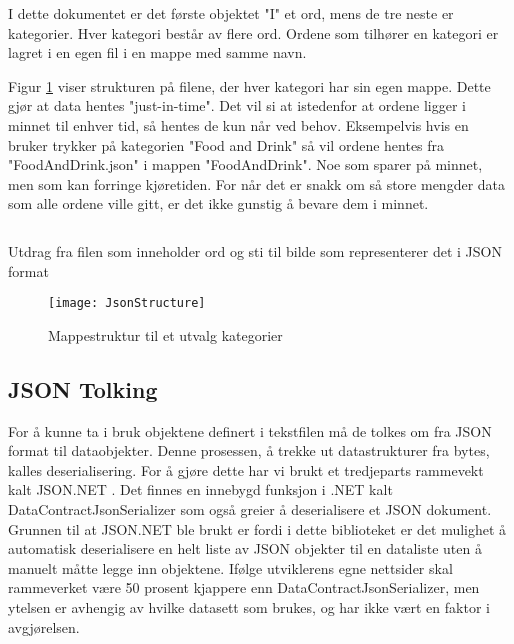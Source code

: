 I dette dokumentet er det første objektet "I" et ord, mens de tre neste er kategorier. Hver kategori består av flere ord. Ordene som tilhører en kategori er lagret i en egen fil i en mappe med samme navn. 

Figur \ref{fig:jsonstructure} viser strukturen på filene, der hver kategori har sin egen mappe. Dette gjør at data hentes "just-in-time". Det vil si at istedenfor at ordene ligger i minnet til enhver tid, så hentes de kun når ved behov. Eksempelvis hvis en bruker trykker på kategorien "Food and Drink" så vil ordene hentes fra "FoodAndDrink.json" i mappen "FoodAndDrink". Noe som sparer på minnet, men som kan forringe kjøretiden. For når det er snakk om så store mengder data som alle ordene ville gitt, er det ikke gunstig å bevare dem i minnet. 


\begin{listing}[ht] 
\inputminted[fontsize=\footnotesize, frame=lines,framesep=2mm,baselinestretch=1.2,bgcolor=lightgray,linenos]{json}{Code/JSONfile.json} 
\caption{Utdrag fra filen som inneholder ord og sti til bilde som representerer det i JSON format} 
\label{listing:jsonfile} 
\end{listing} 
 

 \begin{figure}[ht!] 
\centering 
\texttt{[image: JsonStructure]} 
\caption{Mappestruktur til et utvalg kategorier} 
\label{fig:jsonstructure} 
\end{figure} 


\subsection{JSON Tolking}

For å kunne ta i bruk objektene definert i tekstfilen må de tolkes om fra JSON format til dataobjekter. Denne prosessen, å trekke ut datastrukturer fra bytes, kalles deserialisering. For å gjøre dette har vi brukt et tredjeparts rammevekt kalt JSON.NET \cite{Json.0:online}. Det finnes en innebygd funksjon i .NET kalt DataContractJsonSerializer \cite{DataC3:online} som også greier å deserialisere et JSON dokument. Grunnen til at JSON.NET ble brukt er fordi i dette biblioteket er det mulighet å automatisk deserialisere en helt liste av JSON objekter til en dataliste uten å manuelt måtte legge inn objektene. Ifølge utviklerens egne nettsider skal rammeverket være 50 prosent kjappere enn DataContractJsonSerializer, men ytelsen er avhengig av hvilke datasett som brukes, og har ikke vært en faktor i avgjørelsen. 


